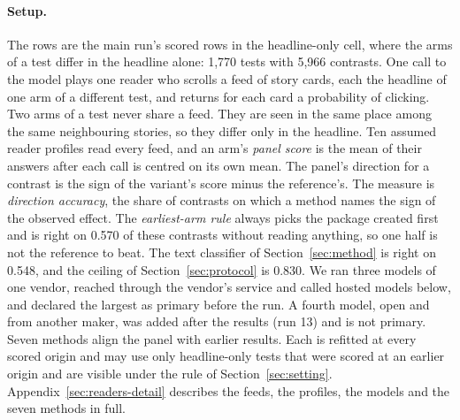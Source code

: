 \paragraph{Setup.} The rows are the main run's scored rows in the headline-only cell, where the arms of a test differ in the headline alone: 1,770 tests with 5,966 contrasts. One call to the model plays one reader who scrolls a feed of story cards, each the headline of one arm of a different test, and returns for each card a probability of clicking. Two arms of a test never share a feed. They are seen in the same place among the same neighbouring stories, so they differ only in the headline. Ten assumed reader profiles read every feed, and an arm's \emph{panel score} is the mean of their answers after each call is centred on its own mean. The panel's direction for a contrast is the sign of the variant's score minus the reference's. The measure is \emph{direction accuracy}, the share of contrasts on which a method names the sign of the observed effect. The \emph{earliest-arm rule} always picks the package created first and is right on 0.570 of these contrasts without reading anything, so one half is not the reference to beat. The text classifier of Section~\ref{sec:method} is right on 0.548, and the ceiling of Section~\ref{sec:protocol} is 0.830. We ran three models of one vendor, reached through the vendor's service and called hosted models below, and declared the largest as primary before the run. A fourth model, open and from another maker, was added after the results (run 13) and is not primary. Seven methods align the panel with earlier results. Each is refitted at every scored origin and may use only headline-only tests that were scored at an earlier origin and are visible under the rule of Section~\ref{sec:setting}. Appendix~\ref{sec:readers-detail} describes the feeds, the profiles, the models and the seven methods in full.

